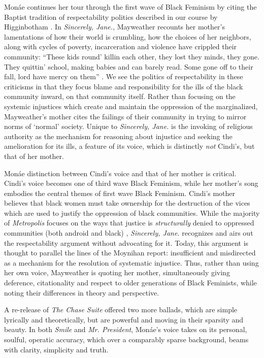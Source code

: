\documentclass[a4paper, 11pt]{article} %
\begin{document}
Mon\'ae continues her tour through the first wave of Black Feminism by citing the Baptist tradition of respectability politics described in our course by Higginbotham .
In \emph{Sincerely, Jane.}, Mayweather recounts her mother's lamentations of how their world is crumbling, how the choices of her neighbors, along with cycles of poverty, incarceration and violence have crippled their community:
``These kids round' killin each other, they lost they minds, they gone. They quittin' school, making babies and can barely read. Some gone off to their fall, lord have mercy on them'' .
We see the politics of respectability in these criticisms in that they focus blame and responsibility for the ills of the black community inward, on that community itself.
Rather than focusing on the systemic injustices which create and maintain the oppression of the marginalized, Mayweather's mother cites the failings of their community in trying to mirror norms of `normal' society.
Unique to \emph{Sincerely, Jane.} is the invoking of religious authority as the mechanism for reasoning about injustice and seeking the amelioration for its ills, a feature of its voice, which is distinctly \emph{not} Cindi's, but that of her mother.

Mon\'ae distinction between Cindi's voice and that of her mother is critical. 
Cindi's voice becomes one of third wave Black Feminism, while her mother's song embodies the central themes of first wave Black Feminism.
Cindi's mother believes that black women must take ownership for the destruction of the vices which are used to justify the oppression of black communities. 
While the majority of \emph{Metropolis} focuses on the ways that justice is \emph{structurally} denied to oppressed communities (both android and black) , \emph{Sincerely, Jane.} recognizes and airs out the respectability argument without advocating for it.
Today, this argument is thought to parallel the lines of the Moynihan report: insufficient and misdirected as a mechanism for the resolution of systematic injustice.
Thus, rather than using her own voice, Mayweather is quoting her mother, simultaneously giving deference, citationality and respect to older generations of Black Feminists, while noting their differences in theory and perspective.

A re-release of \emph{The Chase Suite} offered two more ballads, which are simple lyrically and theoretically, but are powerful and moving in their sparsity and beauty.
In both \emph{Smile} and \emph{Mr. President}, Mon\'ae's voice takes on its personal, soulful, operatic accuracy, which over a comparably sparse background, beams with clarity, simplicity and truth.
\end{document}
